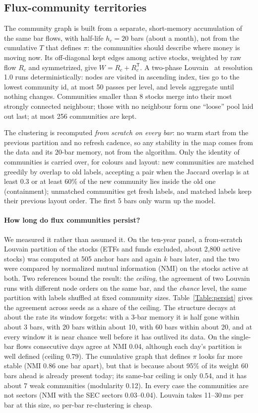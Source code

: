 \documentclass[preprint,3p,twocolumn]{elsarticle}
\begin{document}
\subsection{Flux-community territories}
\label{Section:louvain}
The community graph is built from a separate, short-memory accumulation of the same bar flows, with half-life $h_c=20$ bars (about a month), not from the cumulative $T$ that defines $\pi$: the communities should describe where money is moving now. Its off-diagonal kept edges among active stocks, weighted by raw flow $R_c$ and symmetrized, give $W=R_c+R_c^{\mathsf T}$. A two-phase Louvain~\cite{louvain} at resolution 1.0 runs deterministically: nodes are visited in ascending index, ties go to the lowest community id, at most 50 passes per level, and levels aggregate until nothing changes. Communities smaller than 8 stocks merge into their most strongly connected neighbour; those with no neighbour form one ``loose'' pool laid out last; at most 256 communities are kept.

The clustering is recomputed \emph{from scratch on every bar}: no warm start from the previous partition and no refresh cadence, so any stability in the map comes from the data and its 20-bar memory, not from the algorithm. Only the identity of communities is carried over, for colours and layout: new communities are matched greedily by overlap to old labels, accepting a pair when the Jaccard overlap is at least 0.3 or at least 60\% of the new community lies inside the old one (containment); unmatched communities get fresh labels, and matched labels keep their previous layout order. The first 5 bars only warm up the model.

\paragraph{How long do flux communities persist?} We measured it rather than assumed it. On the ten-year panel, a from-scratch Louvain partition of the stocks (ETFs and funds excluded, about 2,800 active stocks) was computed at 505 anchor bars and again $k$ bars later, and the two were compared by normalized mutual information (NMI) on the stocks active at both. Two references bound the result: the \emph{ceiling}, the agreement of two Louvain runs with different node orders on the same bar, and the \emph{chance} level, the same partition with labels shuffled at fixed community sizes. Table~\ref{Table:persist} gives the agreement across seeds as a share of the ceiling. The structure decays at about the rate its window forgets: with a 3-bar memory it is half gone within about 3 bars, with 20 bars within about 10, with 60 bars within about 20, and at every window it is near chance well before it has outlived its data. On the single-bar flows consecutive days agree at NMI 0.04, although each day's partition is well defined (ceiling 0.79). The cumulative graph that defines $\pi$ looks far more stable (NMI 0.86 one bar apart), but that is because about 95\% of its weight 60 bars ahead is already present today; its same-bar ceiling is only 0.54, and it has about 7 weak communities (modularity 0.12). In every case the communities are not sectors (NMI with the SEC sectors 0.03--0.04). Louvain takes 11--30\,ms per bar at this size, so per-bar re-clustering is cheap.
\end{document}
